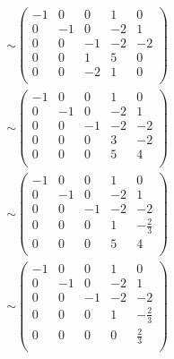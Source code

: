\documentclass[12pt]{report}
\newcounter{it}
\theoremstyle{largebreak}
\begin{document}
\begin{sol}
\begin{equation*}
\begin{split}
            &\sim \left(
                \begin{array}{ccccc}
                    -1 & 0 & 0 & 1 & 0 \\
                    0 & -1 & 0 & -2 & 1 \\
                    0 & 0 & -1 & -2 & -2 \\
                    0 & 0 & 1 & 5 & 0 \\
                    0 & 0 & -2 & 1 & 0 \\
                \end{array}
            \right)\\
            &\sim \left(
                \begin{array}{ccccc}
                    -1 & 0 & 0 & 1 & 0 \\
                    0 & -1 & 0 & -2 & 1 \\
                    0 & 0 & -1 & -2 & -2 \\
                    0 & 0 & 0 & 3 & -2 \\
                    0 & 0 & 0 & 5 & 4 \\
                \end{array}
            \right)\\
            &\sim \left(
                \begin{array}{ccccc}
                    -1 & 0 & 0 & 1 & 0 \\
                    0 & -1 & 0 & -2 & 1 \\
                    0 & 0 & -1 & -2 & -2 \\
                    0 & 0 & 0 & 1 & -\frac{2}{3} \\
                    0 & 0 & 0 & 5 & 4 \\
                \end{array}
            \right)\\
            &\sim \left(
                \begin{array}{ccccc}
                    -1 & 0 & 0 & 1 & 0 \\
                    0 & -1 & 0 & -2 & 1 \\
                    0 & 0 & -1 & -2 & -2 \\
                    0 & 0 & 0 & 1 & -\frac{2}{3} \\
                    0 & 0 & 0 & 0 & \frac{2}{3} \\
                \end{array}
            \right)\\

\end{split}
\end{equation*}
\end{sol}
\end{document}
